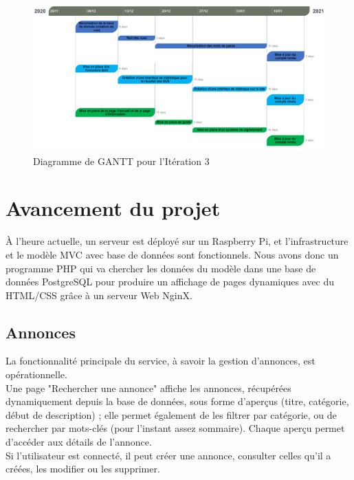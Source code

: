 \documentclass[a4paper,11pt]{article}
\begin{document}
\begin{figure}[H]
  \includegraphics[width=\linewidth]{images/gantt-iteration3.png}
  \caption{Diagramme de GANTT pour l'Itération 3}
  \label{fig:gantt-iteration3}
\end{figure}



\section{Avancement du projet}

À l'heure actuelle, un serveur est déployé sur un Raspberry Pi, et l'infrastructure et le modèle MVC
avec base de données sont fonctionnels. Nous avons donc un programme PHP qui va chercher les
données du modèle dans une base de données PostgreSQL pour produire un affichage de pages
dynamiques avec du HTML/CSS grâce à un serveur Web NginX.\\



\subsection{Annonces}

La fonctionnalité principale du service, à savoir la gestion d'annonces, est opérationnelle.\\
Une page "Rechercher une annonce" affiche les annonces, récupérées dynamiquement depuis la base de données, sous forme d'aperçus (titre, catégorie, début de description) ; elle permet également de les filtrer par catégorie, ou de rechercher par mots-clés (pour l'instant assez sommaire). Chaque aperçu permet d'accéder aux détails de l'annonce.\\
Si l'utilisateur est connecté, il peut créer une annonce, consulter celles qu'il a créées, les modifier ou les supprimer.
\end{document}
